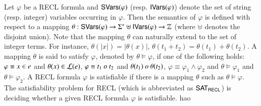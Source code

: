 Let $\varphi$ be a RECL formula and ${\sf SVars}(\varphi)$ (resp. ${\sf IVars}(\varphi)$) denote the set of string (resp. integer) variables occurring in $\varphi$. 
%
Then the semantics of  $\varphi$ is defined with respect to a mapping $\theta: {\sf SVars}(\varphi) \rightarrow \Sigma^* \uplus {\sf IVars}(\varphi) \rightarrow \mathbb{Z}$ (where $\uplus$ denotes the disjoint union). 
Note that the mapping $\theta$ can naturally extend to the set of integer terms. For instance, $\theta(|x|) =|\theta(x)|$, $\theta(t_1 + t_2) = \theta(t_1) + \theta(t_2)$. 
A  mapping $\theta$ is said to satisfy $\varphi$, denoted by $\theta \models \varphi$, if one of the following holds: 
$\varphi \equiv x \in e$ and $\theta(x) \in \mathcal{L}(e)$, 
%
$\varphi \equiv t_1\ \op\ t_2$ and $\theta(t_1)\ \op\ \theta(t_2)$, 
%
$\varphi \equiv \varphi_1 \wedge \varphi_2$ and $\theta \models \varphi_1$ and $\theta \models \varphi_2$.
A RECL formula $\varphi$ is satisfiable if there is a mapping $\theta$ such as $\theta \models \varphi$. The satisfiability problem for RECL (which is abbreviated as ${\sf SAT_{RECL}}$) is deciding whether a given RECL formula $\varphi$ is satisfiable. 
hao